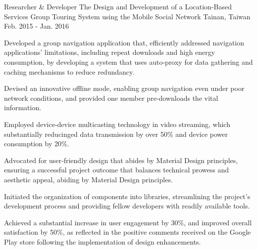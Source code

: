 

\begin{cventries}

  \cventry
    {Researcher \& Developer} %
    {The Design and Development of a Location-Based Services Group Touring System using the Mobile Social Network} %
    {Tainan, Taiwan} %
    {Feb. 2015 - Jan. 2016} %
    {
      \begin{cvitems} %
        \item {Developed a group navigation application that, efficiently addressed navigation applications' limitations, including repeat downloads and high energy consumption, by developing a system that uses auto‑proxy for data gathering and caching mechanisms to reduce redundancy. }
        \item {Devised an innovative offline mode, enabling group navigation even under poor network conditions, and provided one member pre-downloads the vital information.}
        \item {Employed device‑device multicasting technology in video streaming, which substantially reducinged data transmission by over 50\% and device power consumption by 20\%.}
        \item {Advocated for user‑friendly design that abides by Material Design principles, ensuring a successful project outcome that balances technical prowess and aesthetic appeal, abiding by Material Design principles.}
        \item {Initiated the organization of components into libraries, streamlining the project's development process and providing fellow developers with readily available tools.}
        \item {Achieved a substantial increase in user engagement by 30\%, and improved overall satisfaction by 50\%, as reflected in the positive comments received on the Google Play store following the implementation of design enhancements.}
      \end{cvitems}
    }

\end{cventries}
